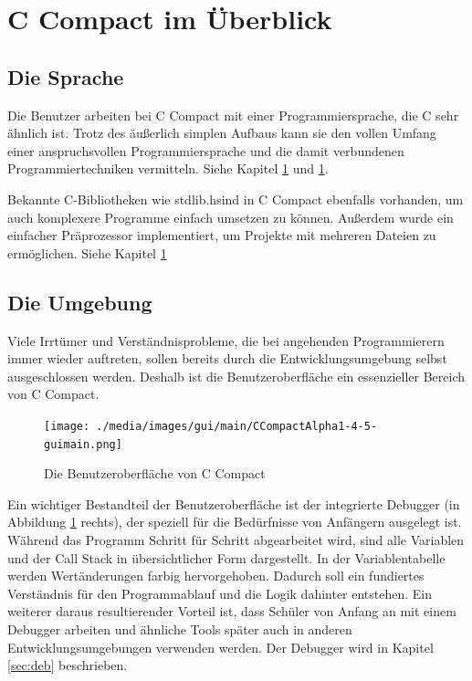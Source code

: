 \section{C Compact im Überblick}

\subsection*{Die Sprache}
Die Benutzer arbeiten bei C Compact mit einer Programmiersprache, die C sehr ähnlich ist. Trotz des äußerlich simplen Aufbaus kann sie den vollen Umfang einer anspruchsvollen Programmiersprache und die damit verbundenen Programmiertechniken vermitteln. Siehe Kapitel \ref{} und \ref{}.

Bekannte C-Bibliotheken wie \glqq{}stdlib.h\grqq{}sind in C Compact ebenfalls vorhanden, um auch komplexere Programme einfach umsetzen zu können. Außerdem wurde ein einfacher Präprozessor implementiert, um Projekte mit mehreren Dateien zu ermöglichen. Siehe Kapitel \ref{}

\subsection*{Die Umgebung}
Viele Irrtümer und Verständnisprobleme, die bei angehenden Programmierern immer wieder auftreten, sollen bereits durch die Entwicklungsumgebung selbst ausgeschlossen werden. Deshalb ist die Benutzeroberfläche ein essenzieller Bereich von C Compact. %


\begin{figure}[h!]
	\centering
	\texttt{[image: ./media/images/gui/main/CCompactAlpha1-4-5-guimain.png]}
	\caption{Die Benutzeroberfläche von C Compact}
	\label{fig:intro-over-gui}
\end{figure}

Ein wichtiger Bestandteil der Benutzeroberfläche ist der integrierte Debugger (in Abbildung \ref{fig:intro-over-gui} rechts), der speziell für die Bedürfnisse von Anfängern ausgelegt ist. Während das Programm Schritt für Schritt abgearbeitet wird, sind alle Variablen und der Call Stack in übersichtlicher Form dargestellt. In der Variablentabelle werden Wertänderungen farbig hervorgehoben. Dadurch soll ein fundiertes Verständnis für den Programmablauf und die Logik dahinter entstehen.
Ein weiterer daraus resultierender Vorteil ist, dass Schüler von Anfang an mit einem Debugger arbeiten und ähnliche Tools später auch in anderen Entwicklungsumgebungen verwenden werden. Der Debugger wird in Kapitel \ref{sec:deb} beschrieben.


